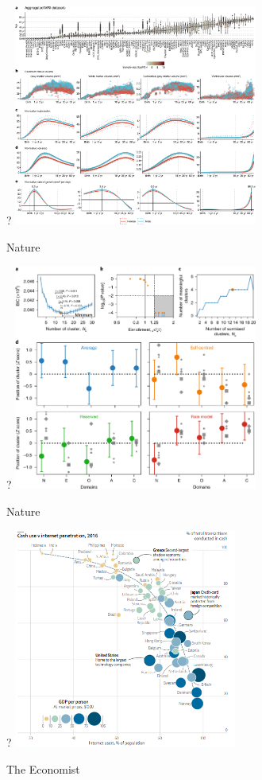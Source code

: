 \documentclass[notes, aspectratio=1610]{beamer}
\begin{document}
\begin{frame}{?}{}
	\centering
	\includegraphics[width=0.6\textwidth]{images/nature_0.png}
	\pause

	Nature
\end{frame}

\begin{frame}{?}{}
	\centering
	\includegraphics[width=0.6\textwidth]{images/nature_1.png}
	\pause

	Nature
\end{frame}

\begin{frame}{?}{}
	\centering
	\includegraphics[width=0.55\textwidth]{images/econ_1.png}
	\pause

	The Economist
\end{frame}
\end{document}
